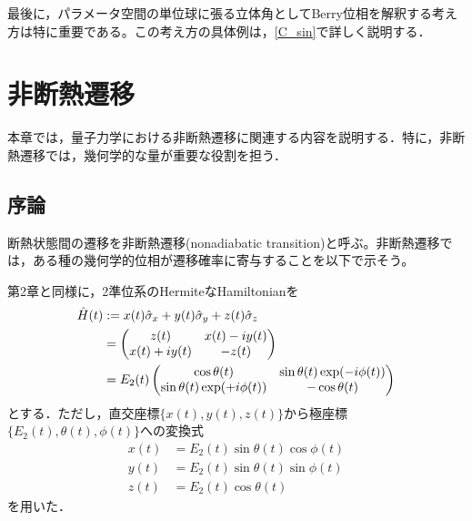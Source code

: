 \documentclass[a4paper, titlepage]{jsreport}
\begin{document}
最後に，パラメータ空間の単位球に張る立体角としてBerry位相を解釈する考え方は特に重要である。この考え方の具体例は，\ref{C_sin}で詳しく説明する．


\chapter{非断熱遷移}\label{NT}
本章では，量子力学における非断熱遷移に関連する内容を説明する．特に，非断熱遷移では，幾何学的な量が重要な役割を担う．


\section{序論}
断熱状態間の遷移を非断熱遷移(nonadiabatic transition)と呼ぶ。非断熱遷移では，ある種の幾何学的位相が遷移確率に寄与することを以下で示そう。


第2章と同様に，2準位系のHermiteなHamiltonianを
    \begin{align}
    \Hat{H}(t)&:=x(t)\Hat{\sigma}_x + y(t) \Hat{\sigma}_y + z(t) \Hat{\sigma}_z\\
    &=
    \begin{pmatrix} 
    z(t) & x(t) - iy(t)\\
    x(t) + iy(t) & -z(t)\\
    \end{pmatrix}\\
    &= E_2(t)
    \begin{pmatrix} 
    \cos \theta(t)&\sin \theta(t) \exp(-i\phi(t))\\
    \sin \theta(t) \exp(+i\phi(t))&-\cos \theta(t)\\
    \end{pmatrix}
\end{align}
とする．ただし，直交座標$\{x(t), y(t), z(t)\}$から極座標$\{E_2(t), \theta(t), \phi(t)\}$への変換式
\begin{align}
  x(t) &= E_2(t) \sin \theta(t) \cos \phi(t)\\
  y(t) &= E_2(t) \sin \theta(t) \sin \phi(t)\\
  z(t) &= E_2(t) \cos \theta(t)
\end{align}
を用いた．
\end{document}
